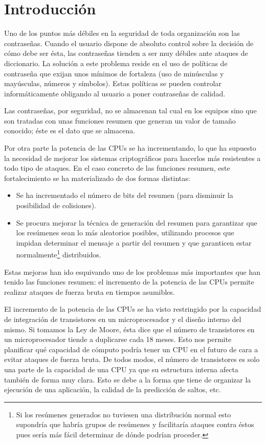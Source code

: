 \chapter{Introducción}

Uno de los puntos más débiles en la seguridad de toda organización son las contraseñas. Cuando el usuario dispone de absoluto control sobre la decisión de cómo debe ser ésta, las contraseñas tienden a ser muy débiles ante ataques de diccionario. La solución a este problema reside en el uso de políticas de contraseña que exijan unos mínimos de fortaleza (uso de minúsculas y mayúsculas, números y símbolos). Estas políticas se pueden controlar informáticamente obligando al usuario a poner contraseñas de calidad.

Las contraseñas, por seguridad, no se almacenan tal cual en los equipos sino que son tratadas con unas funciones resumen que generan un valor de tamaño conocido; éste es el dato que se almacena.

Por otra parte la potencia de las CPUs se ha incrementando, lo que ha supuesto la necesidad de mejorar los sistemas criptográficos para hacerlos más resistentes a todo tipo de ataques. En el caso concreto de las funciones resumen, este fortalecimiento se ha materializado de dos formas distintas:

\begin{itemize}
	\item Se ha incrementado el número de bits del resumen (para disminuir la posibilidad de colisiones).
	
	\item Se procura mejorar la técnica de generación del resumen para garantizar que los resúmenes sean lo más aleatorios posibles, utilizando procesos que impidan determinar el mensaje a partir del resumen y que garanticen estar normalmente\footnote{Si los resúmenes generados no tuviesen una distribución normal esto supondría que habría grupos de resúmenes y facilitaría ataques contra éstos pues sería más fácil determinar de dónde podrían proceder.} distribuidos. 
\end{itemize}

Estas mejoras han ido esquivando uno de los problemas más importantes que han tenido las funciones resumen: el incremento de la potencia de las CPUs permite realizar ataques de fuerza bruta en tiempos asumibles.

El incremento de la potencia de las CPUs se ha visto restringido por la capacidad de integración de transistores en un microprocesador y el diseño interno del mismo. Si tomamos la Ley de Moore, ésta dice que el número de transistores en un microprocesador tiende a duplicarse cada 18 meses. Esto nos permite planificar qué capacidad de cómputo podría tener un CPU en el futuro de cara a evitar ataques de fuerza bruta. De todos modos, el número de transistores es solo una parte de la capacidad de una CPU ya que su estructura interna afecta también de forma muy clara. Esto se debe a la forma que tiene de organizar la ejecución de una aplicación, la calidad de la predicción de saltos, etc.

